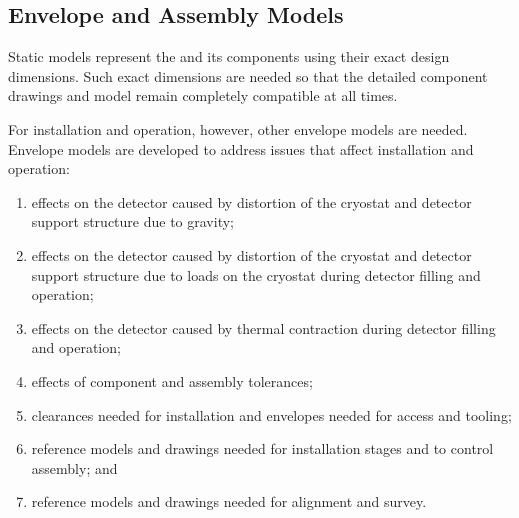 
\subsection{Envelope and Assembly Models}
\label{sec:fdsp-coord-integ-envelope}

Static models represent the  and its components using their exact
design dimensions. Such exact dimensions are needed so that the
detailed component drawings and model remain completely compatible at all
times.


For installation and operation, however, other envelope models are
needed. Envelope models are developed to address issues that affect
installation and operation:
\begin{enumerate}
 \item effects on the detector caused by distortion of the cryostat
   and detector support structure due to gravity;
 \item effects on the detector caused by distortion of the cryostat
   and detector support structure due to loads on the cryostat during
   detector filling and operation;
 \item effects on the detector caused by thermal contraction during
   detector filling and operation;
 \item effects of component and
   assembly tolerances;
 \item clearances needed for installation and envelopes needed for
   access and tooling;
 \item reference models and drawings needed for installation stages
   and to control assembly; and
 \item reference models and drawings needed for alignment and survey.
\end{enumerate}


